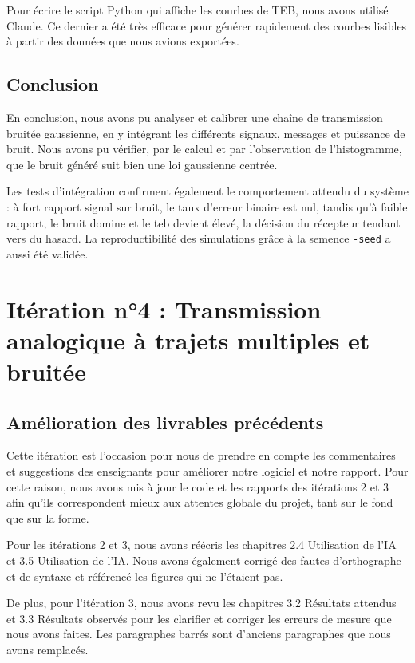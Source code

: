 \documentclass[a4paper,12pt]{report}
\begin{document}
Pour écrire le script Python qui affiche les courbes de TEB, nous avons utilisé Claude. Ce dernier a été très efficace pour générer rapidement des courbes lisibles à partir des données que nous avions exportées.

\section{Conclusion}

En conclusion, nous avons pu analyser et calibrer une chaîne de transmission bruitée gaussienne, en y intégrant les différents signaux, messages et puissance de bruit. Nous avons pu vérifier, par le calcul et par l'observation de l'histogramme, que le bruit généré suit bien une loi gaussienne centrée.

Les tests d'intégration confirment également le comportement attendu du système : à fort rapport signal sur bruit, le taux d'erreur binaire est nul, tandis qu'à faible rapport, le bruit domine et le \gls{teb} devient élevé, la décision du récepteur tendant vers du
hasard. La reproductibilité des simulations grâce à la semence
\texttt{-seed} a aussi été validée.

\chapter{Itération n°4 : Transmission analogique à trajets multiples et bruitée}

\section{Amélioration des livrables précédents}
Cette itération est l'occasion pour nous de prendre en compte les commentaires et suggestions des enseignants pour améliorer notre logiciel et notre rapport. Pour cette raison, nous avons mis à jour le code et les rapports des itérations 2 et 3 afin qu'ils correspondent mieux aux attentes globale du projet, tant sur le fond que sur la forme.

Pour les itérations 2 et 3, nous avons réécris les chapitres 2.4 Utilisation de l'IA et 3.5 Utilisation de l'IA. Nous avons également corrigé des fautes d'orthographe et de syntaxe et référencé les figures qui ne l'étaient pas.

De plus, pour l'itération 3, nous avons revu les chapitres 3.2 Résultats attendus et 3.3 Résultats observés pour les clarifier et corriger les erreurs de mesure que nous avons faites. Les paragraphes barrés sont d'anciens paragraphes que nous avons remplacés.
\end{document}
